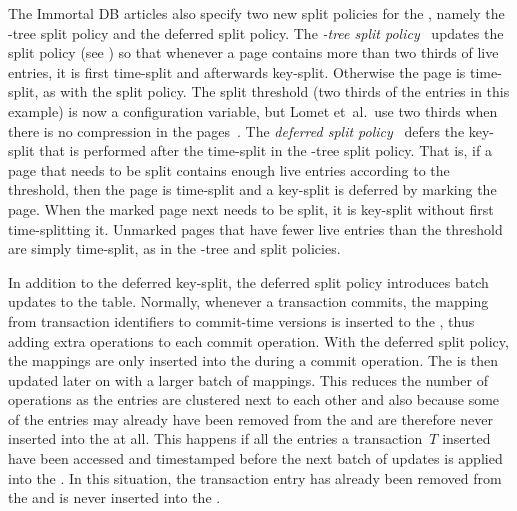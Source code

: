 The Immortal DB articles also specify two new split policies for the
\TSBtree, namely the -tree split policy and the deferred split
policy. 
The \emph{-tree split
policy}~\cite{lomet:2008:version-compression} updates the  split
policy (see ) so that whenever a page contains more than
two thirds of live entries, it is first time-split and afterwards key-split.
Otherwise the page is time-split, as with the  split policy.
The split threshold (two thirds of the entries in this example) is now a
configuration variable, but Lomet et~al.\ use two thirds when there is no
compression in the pages~\cite{lomet:2008:version-compression}.
The \emph{deferred split policy}~\cite{lomet:2009:improving} defers the
key-split that is performed after the time-split in the -tree split
policy.
That is, if a page that needs to be split contains enough live entries
according to the threshold, then the page is time-split and a key-split is
deferred by marking the page.
When the marked page next needs to be split, it is key-split without first
time-splitting it.
Unmarked pages that have fewer live entries than the threshold are
simply time-split, as in the -tree and  split policies.

In addition to the deferred key-split, the deferred split policy introduces
batch updates to the  table. 
Normally, whenever a transaction commits, the mapping from transaction
identifiers to commit-time versions is inserted to the , thus
adding extra  operations to each commit operation.
With the deferred split policy, the mappings are only inserted into the
 during a commit operation.
The  is then updated later on with a larger batch of mappings. 
This reduces the number of  operations as the  entries
are clustered next to each other and also because some of the entries may
already have been removed from the  and are therefore never
inserted into the  at all.
This happens if all the entries a transaction~$T$ inserted have been accessed
and timestamped before the next batch of updates is applied into the
\@. 
In this situation, the transaction entry has already been removed from the
 and is never inserted into the .

